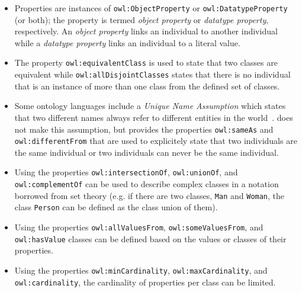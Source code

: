 \begin{itemize}
  \item Properties are instances of \texttt{owl:ObjectProperty} or \texttt{owl:DatatypeProperty} (or both); the property is termed \emph{object property} or \emph{datatype property}, respectively. An \emph{object property} links an individual to another individual while a \emph{datatype property} links an individual to a literal value.
  \item The property \texttt{owl:equivalentClass} is used to state that two classes are equivalent while \texttt{owl:allDisjointClasses} states that there is no individual that is an instance of more than one class from the defined set of classes.
  \item Some ontology languages include a \emph{Unique Name Assumption} which states that two different names always refer to different entities in the world~\cite{unique_name_assumption}.  does not make this assumption, but provides the properties \texttt{owl:sameAs} and \texttt{owl:differentFrom} that are used to explicitely state that two individuals are the same individual or two individuals can never be the same individual.
  \item Using the properties \texttt{owl:intersectionOf}, \texttt{owl:unionOf}, and \texttt{owl:\hspace{0pt}complement\hspace{0pt}Of} can be used to describe complex classes in a notation borrowed from set theory (e.g. if there are two classes, \texttt{Man} and \texttt{Woman}, the class \texttt{Person} can be defined as the class union of them). %
  \item Using the properties \texttt{owl:allValuesFrom}, \texttt{owl:someValuesFrom}, and \texttt{owl:\hspace{0pt}has\hspace{0pt}Value} classes can be defined based on the values or classes of their properties.
  \item Using the properties \texttt{owl:minCardinality}, \texttt{owl:maxCardinality}, and \texttt{owl:\hspace{0pt}cardinality}, the cardinality of properties per class can be limited.

\end{itemize}
